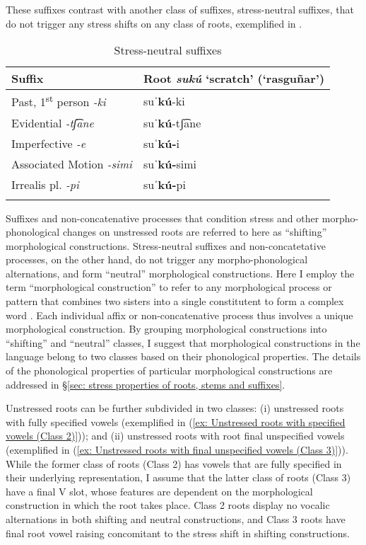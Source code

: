 These suffixes contrast with another class of suffixes, stress-neutral suffixes, that do not trigger any stress shifts on any class of roots, exemplified in .

\begin{table}
\caption{Stress-neutral suffixes}
\label{tab:key:9}

\begin{tabularx}{\textwidth}{Xl}
\lsptoprule
 \textbf{Suffix} & \textbf{Root \textit{sukú} }\textbf{‘scratch’ (‘rasguñar’)}\\
 \midrule
 Past, 1\textsuperscript{st} person \textit{-ki} & su\textbf{ˈkú}{}-ki\\
 Evidential \textit{-tʃ͡ane} & su\textbf{ˈkú}{}-tʃ͡ane\\
 Imperfective \textit{-e} & su\textbf{ˈkú-}i\\
 Associated Motion \textit{-simi} & su\textbf{ˈkú-}simi\\
 Irrealis pl. \textit{-pi} & su\textbf{ˈkú-}pi\\
\lspbottomrule
\end{tabularx}
\end{table}

Suffixes and non-concatenative processes that condition stress and other mor\-pho-phonological changes on unstressed roots are referred to here as ``shifting'' morphological constructions. Stress-neutral suffixes and non-concatetative processes, on the other hand, do not trigger any morpho-phonological alternations, and form ``neutral'' morphological constructions. Here I employ the term ``morphological construction'' to refer to any morphological process or pattern that combines two sisters into a single constitutent to form a complex word \citep[][12]{inkelas2005reduplication}. Each individual affix or non-concatenative process thus involves a unique morphological construction. By grouping morphological constructions into ``shifting'' and ``neutral'' classes, I suggest that morphological constructions in the language belong to two classes based on their phonological properties. The details of the phonological properties of particular morphological constructions are addressed in §\ref{sec: stress properties of roots, stems and suffixes}.


Unstressed roots can be further subdivided in two classes: (i) unstressed roots with fully specified vowels (exemplified in (\ref{ex: Unstressed roots with specified vowels (Class 2)})); and (ii) unstressed roots with root final unspecified vowels (exemplified in (\ref{ex: Unstressed roots with final unspecified vowels (Class 3)})). While the former class of roots (Class 2)  has vowels that are fully specified in their underlying representation, I assume that the latter class of roots (Class 3) have a final V slot, whose features are dependent on the morphological construction in which the root takes place. Class 2 roots display no vocalic alternations in both shifting and neutral constructions, and Class 3 roots have final root vowel raising concomitant to the stress shift in shifting constructions.

